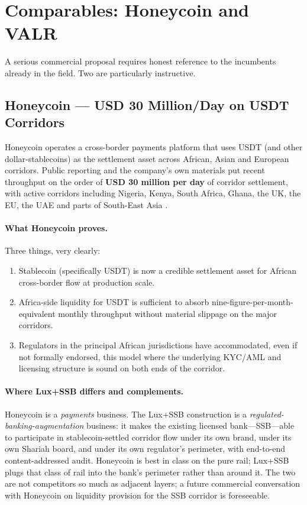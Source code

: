 \documentclass[11pt,letterpaper]{article}
\begin{document}
\section{Comparables: Honeycoin and VALR}

A serious commercial proposal requires honest reference to the
incumbents already in the field. Two are particularly instructive.

\subsection{Honeycoin --- USD 30 Million/Day on USDT Corridors}

Honeycoin operates a cross-border payments platform that uses
USDT (and other dollar-stablecoins) as the settlement asset across
African, Asian and European corridors. Public reporting and the
company's own materials put recent throughput on the order of
\textbf{USD 30 million per day} of corridor settlement, with active
corridors including Nigeria, Kenya, South Africa, Ghana, the UK, the
EU, the UAE and parts of South-East Asia
\cite{honeycoin_techcrunch, honeycoin_site}.

\paragraph{What Honeycoin proves.} Three things, very clearly:
\begin{enumerate}[leftmargin=1.6em]
  \item Stablecoin (specifically USDT) is now a credible settlement
        asset for African cross-border flow at production scale.
  \item Africa-side liquidity for USDT is sufficient to absorb
        nine-figure-per-month-equivalent monthly throughput without
        material slippage on the major corridors.
  \item Regulators in the principal African jurisdictions have
        accommodated, even if not formally endorsed, this model where
        the underlying KYC/AML and licensing structure is sound on
        both ends of the corridor.
\end{enumerate}

\paragraph{Where Lux+SSB differs and complements.} Honeycoin is a
\emph{payments} business. The Lux+SSB construction is a
\emph{regulated-banking-augmentation} business: it makes the existing
licensed bank---SSB---able to participate in stablecoin-settled
corridor flow under its own brand, under its own Shariah board, and
under its own regulator's perimeter, with end-to-end content-addressed
audit. Honeycoin is best in class on the pure rail; Lux+SSB plugs that
class of rail into the bank's perimeter rather than around it. The two
are not competitors so much as adjacent layers; a future commercial
conversation with Honeycoin on liquidity provision for the SSB
corridor is foreseeable.
\end{document}
